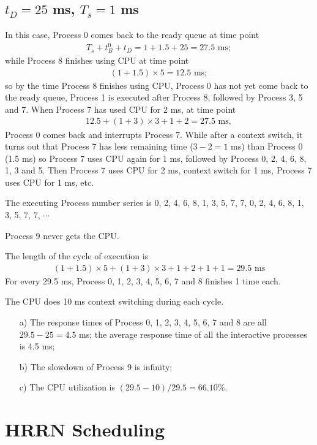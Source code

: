 \documentclass[12pt,letterpaper]{article}
\begin{document}
\subsection{$t_D=25$ ms, $T_s = 1$ ms}
In this case, Process 0 comes back to the ready queue at time point
\begin{eqnarray}
T_s+t_B^0+t_D=1+1.5+25=27.5\textrm{ ms};
\end{eqnarray}
while Process 8 finishes using CPU at time point 
\begin{eqnarray}
(1+1.5)\times5=12.5\textrm{ ms};
\end{eqnarray}
so by the time Process 8 finishes using CPU, Process 0 has not yet come back to the ready queue, Process 1 is executed after Process 8, followed by Process 3, 5 and 7. When Process 7 has used CPU for 2 ms, at time point
\begin{eqnarray}
12.5+(1+3)\times3+1+2=27.5\textrm{ ms},
\end{eqnarray}
Process 0 comes back and interrupts Process 7. While after a context switch, it turns out that Process 7 has less remaining time ($3-2=1$ ms) than Process 0 (1.5 ms) so Process 7 uses CPU again for 1 ms, followed by Process 0, 2, 4, 6, 8, 1, 3 and 5. Then Process 7 uses CPU for 2 ms, context switch for 1 ms, Process 7 uses CPU for 1 ms, etc.

The executing Process number series is 0, 2, 4, 6, 8, 1, 3, 5, 7, 7, 0, 2, 4, 6, 8, 1, 3, 5, 7, 7, $\cdots$

Process 9 never gets the CPU.

The length of the cycle of execution is 
\begin{eqnarray}
(1+1.5)\times5+(1+3)\times3+1+2+1+1=29.5\textrm{ ms}
\end{eqnarray}
For every 29.5 ms, Process 0, 1, 2, 3, 4, 5, 6, 7 and 8 finishes 1 time each.

The CPU does 10 ms context switching during each cycle.

\begin{enumerate}
\item[a)] The response times of Process 0, 1, 2, 3, 4, 5, 6, 7 and 8 are all $29.5-25=4.5$ ms; the average response time of all the interactive processes is 4.5 ms;
\item[b)] The slowdown of Process 9 is infinity;
\item[c)] The CPU utilization is $(29.5-10)/29.5=66.10\%$.
\end{enumerate}

\section{HRRN Scheduling}
\end{document}
